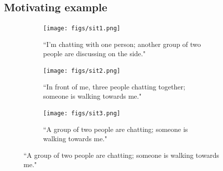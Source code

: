\subsection{Motivating example}

\begin{figure}[ht!]
     \centering
     \begin{subfigure}[b]{0.3\columnwidth}
         \centering
         \texttt{[image: figs/sit1.png]}
         \caption{``I'm chatting with one person; another group of two people
         are discussing on the side."}

         \label{soc_sit_a}
     \end{subfigure}
     \begin{subfigure}[b]{0.3\columnwidth}
         \centering
         \texttt{[image: figs/sit2.png]}
         \caption{``In front of me, three people chatting together;
         someone is walking towards me."}
         \label{soc_sit_b}
     \end{subfigure}
     \begin{subfigure}[b]{0.3\columnwidth}
         \centering
         \texttt{[image: figs/sit3.png]}
         \caption{``A group of two people are chatting;
         someone is walking towards me."}
         \label{soc_sit_c}
     \end{subfigure}


\end{figure}
